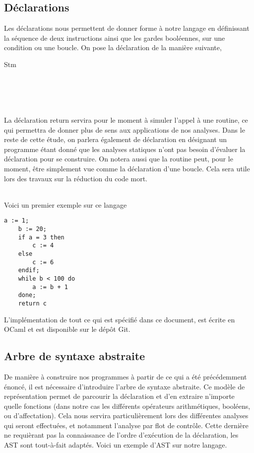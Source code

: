 \documentclass[a4paper, 10pt]{article}
\begin{document}
\subsection{Déclarations}
Les déclarations nous permettent de donner forme à notre langage en définissant la séquence de deux instructions ainsi
que les gardes booléennes, sur une condition ou une boucle. On pose la déclaration de la manière suivante,

\begin{dtype}{Stm}
  \\
  \\
  \akind{\sskip}\\
  \\
  \\
\end{dtype}
La déclaration return servira pour le moment à simuler l'appel à une routine, ce qui permettra de donner plus de sens aux applications de nos analyses.
Dans le reste de cette étude, on parlera également de déclaration en désignant un programme étant donné que les analyses statiques
n'ont pas besoin d'évaluer la déclaration pour se construire. On notera aussi que la routine peut, pour le moment, être
simplement vue comme la déclaration d'une boucle. Cela sera utile lors des travaux sur la réduction du code mort.
\\
\\
\begin{example}
	Voici un premier exemple sur ce langage
	\begin{lstlisting}[tabsize=2]
	a := 1;
	b := 20;
	if a = 3 then
		c := 4
	else
		c := 6
	endif;
	while b < 100 do
		a := b + 1
	done;
	return c
	\end{lstlisting}
\end{example}
L'implémentation de tout ce qui est spécifié dans ce document, est écrite en OCaml et est disponible sur le dépôt Git.

\subsection{Arbre de syntaxe abstraite}
De manière à construire nos programmes à partir de ce qui a été précédemment énoncé, il est nécessaire d'introduire 
l'arbre de syntaxe abstraite. Ce modèle de représentation permet de parcourir la déclaration et d'en extraire n'importe
quelle fonctions (dans notre cas les différents opérateurs arithmétiques, booléens, ou d'affectation). 
Cela nous servira particulièrement lors des différentes analyses qui seront effectuées, et notamment l'analyse par flot de contrôle. 
Cette dernière ne requièrant pas la connaissance de l'ordre d'exécution de la déclaration, les AST sont tout-à-fait adaptés.
Voici  un exemple d'AST sur notre langage.
\end{document}
